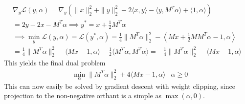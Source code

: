 \documentclass{article}
\begin{document}
\begin{align}
		\nabla_y \mathcal{L}(y, \alpha) = \nabla_y(\|x\|_2^2 + \|y\|_2^2 - 2\langle x, y\rangle - \langle y, M^T \alpha\rangle + \langle 1, \alpha\rangle)\\
		= 2y - 2x - M^T\alpha \implies y^* = x + \frac{1}{2} M^T \alpha\\
		\implies \min_y \mathcal{L}(y, \alpha) = \mathcal{L}(y^*, \alpha) = \frac{1}{4} \|M^T\alpha\|_2^2 - \left\langle Mx + \frac{1}{2} MM^T \alpha - 1, \alpha\right\rangle\\
		= \frac{1}{4}\|M^T\alpha\|_2^2 - \langle Mx - 1, \alpha\rangle - \frac{1}{2}\langle M^T\alpha, M^T\alpha\rangle = -\frac{1}{4} \|M^T\alpha\|_2^2 - \langle Mx - 1, \alpha\rangle 
\end{align}
This yields the final dual problem
\begin{align}
		&\min_\alpha \|M^T\alpha\|_2^2 + 4\langle Mx - 1, \alpha\rangle & \alpha \geq 0
\end{align}
This can now easily be solved by gradient descent with weight clipping, since projection to the non-negative orthant is a simple as $\max(\alpha, 0)$. 
\end{document}
